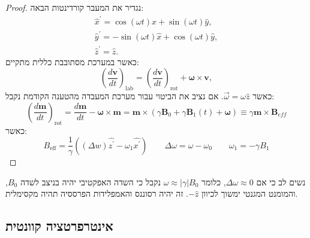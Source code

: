 \documentclass{tstextbook}
\begin{document}
\begin{proof}
נגדיר את המעבר קורדינטות הבאה:
$$\begin{array}{c}{{\hat{x}^{\prime}=\cos(\omega t)\hat{x}+\sin(\omega t)\hat{y},}}\\ {{\hat{y}^{\prime}=-\sin(\omega t)\hat{x}+\cos(\omega t)\hat{y},}}\\ {{\hat{z}^{\prime}=\hat{z}.}}\end{array}$$
כאשר במערכת מסתובבת כללית מתקיים:
$$\left({\frac{d\mathbf{v}}{d t}}\right)_{\mathrm{lab}}=\left({\frac{d\mathbf{v}}{d t}}\right)_{\mathrm{rot}}+{\boldsymbol{\omega}}\times\mathbf{v},$$
כאשר \(\vec{\omega}=\omega \hat{z}\). אם נציב את הביטוי עבור מערכת המעבדה מהטענה הקודמת נקבל:
$$\left(\frac{d\mathbf{m}}{d t}\right)_{\text{rot}}=\frac{d\mathbf{m}}{d t}-\mathbf{\omega}\times\mathbf{m}=\mathbf{m}\times\left( \gamma\mathbf{B}_{0}+\gamma\mathbf{B}_{1}(t)+\mathbf{\omega} \right)\equiv\gamma\mathbf{m}\times\mathbf{B}_{e f f}$$
כאשר:
$$B_{\text{eff}}=\frac{1}{\gamma}\left(\left( \Delta w \right)\hat{z^{\prime}}-\omega_{1}\hat{x^{\prime}}\right) \qquad  \Delta \omega= \omega-\omega_{0}\qquad \omega_{1}=-\gamma B_{1}$$

\end{proof}
\begin{definition}
\end{definition}
\begin{remark}
נשים לב כי אם \(\Delta \omega \approx 0\), כלומר \(\omega \approx |\gamma|B_{0}\) נקבל כי השדה האפקטיבי יהיה בניצב לשדה \(B_{0}\), והמומנט המגנטי ימשוך לכיוון \(-\hat{z}\). זה יהיה רסוננס והאמפלידות הפרססיה תהיה מקסימלית.

\end{remark}
\subsection{אינטרפרטציה קוונטית}
\end{document}
